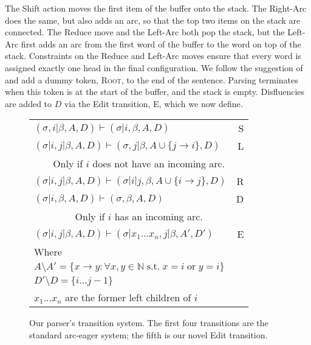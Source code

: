 \documentclass[11pt,letterpaper]{article}
\begin{document}
The Shift action moves the first item of the buffer onto the stack.
The Right-Arc does the same, but also adds an arc, so that the top two items
on the stack are connected. The Reduce move and the Left-Arc both pop the stack,
but the Left-Arc first adds an arc from the first word of the buffer to the word
on top of the stack. Constraints on the Reduce and Left-Arc
moves ensure that every word is assigned exactly one head in the final configuration.
We follow the suggestion of \citet{nivre:squib} and
add a dummy token, \textsc{Root}, to the end of the sentence.  Parsing terminates
when this token is at the start of the buffer, and the stack is empty.
Disfluencies are added to $D$ via the Edit transition, E, which we now define.



\begin{figure}
    \centering
    \small
    \begin{tabular}{lr}
        $(\sigma,i | \beta, A, D) \vdash (\sigma | i, \beta, A, D) $ \hfill & \hfill S \\
        $(\sigma | i,j | \beta, A, D) \vdash ( \sigma, j | \beta, A \cup \{ j \rightarrow i \}, D ) $ \hfill & \hfill L \\
        \multicolumn{2}{c}{Only if $i$ does not have an incoming arc.}\\
        $(\sigma | i,j | \beta, A, D) \vdash ( \sigma | i | j, \beta, A \cup \{ i \rightarrow j \}, D ) $ \hfill & \hfill R \\
        $(\sigma | i, \beta, A, D) \vdash ( \sigma, \beta, A, D )$ \hfill & \hfill  D \\
        \multicolumn{2}{c}{Only if $i$ has an incoming arc.}\\
    \hline
    $(\sigma | i, j | \beta, A, D) \vdash (\sigma | x_1...x_n, j | \beta,A',D')$ & E \\
    Where \\
    $A \setminus A' = \{x \rightarrow y : \forall x,y \in \mathbb{N}\;\mathrm{s.t.}\;x = i\;\mathrm{or}\;y = i\} $\\
    $D' \setminus D = \{i...j-1\}$ \\
    $x_1...x_n$ are the former left children of $i$ \\
    \end{tabular}
    \caption{\small Our parser's transition system.  The first four transitions
             are the standard arc-eager system; the fifth is our novel Edit
             transition.\label{fig:ae_notation}}
\end{figure}
\end{document}
